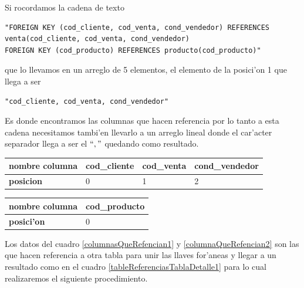 Si rocordamos la cadena de texto 
\lstset{language=sql,breaklines=true}
\begin{lstlisting}
"FOREIGN KEY (cod_cliente, cod_venta, cond_vendedor) REFERENCES venta(cod_cliente, cod_venta, cond_vendedor)
FOREIGN KEY (cod_producto) REFERENCES producto(cod_producto)"
\end{lstlisting}
que lo llevamos en un arreglo de 5 elementos, el elemento de la posici'on 1 que llega a ser
\lstset{language=sql,breaklines=true}
\begin{lstlisting}
"cod_cliente, cod_venta, cond_vendedor"
\end{lstlisting}
Es donde encontramos las columnas que hacen referencia por lo tanto a esta cadena necesitamos tambi'en llevarlo a un arreglo lineal donde el car'acter separador llega a ser el $`` , " $  quedando como resultado.
\begin{center}
\scriptsize
\renewcommand{\arrayrulewidth}{1pt}
  \label{columnasQueRefencian1} %
  \begin{tabular}{|l|l|l|l|}
\hline
\textbf{nombre columna} & cod\_cliente & cod\_venta & cond\_vendedor \\ \hline
\textbf{posicion}       & 0            & 1          & 2              \\ \hline
\end{tabular}
\end{center}


\begin{center}
\scriptsize
\renewcommand{\arrayrulewidth}{1pt}
  \label{columnaQueRefencian2} %
  \begin{tabular}{|l|l|}
\hline
\textbf{nombre columna} & cod\_producto \\ \hline
\textbf{posici'on}      & 0             \\ \hline
\end{tabular}
\end{center}

Los datos del cuadro \ref{columnasQueRefencian1} y \ref{columnaQueRefencian2} son las que hacen referencia a otra tabla para unir las llaves for'aneas y llegar a un resultado como en el cuadro \ref{tableReferenciasTablaDetalle1} para lo cual realizaremos el siguiente procedimiento.

